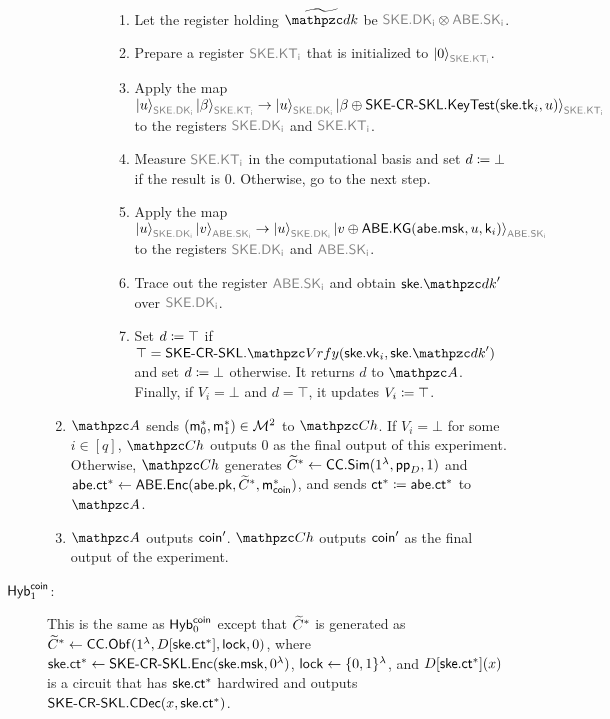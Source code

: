 \begin{description}
\begin{enumerate}
\begin{description}
\begin{enumerate}
    \item Let the register holding $\widetilde{\qdk}$ be $\qreg{SKE.DK_i}\tensor\qreg{ABE.SK_i}$.
    \item Prepare a register $\qreg{SKE.KT_i}$ that is initialized to $\ket{0}_{\qreg{SKE.KT_i}}$.
    \item Apply the map $\ket{u}_{\qreg{SKE.DK_i}}\ket{\beta}_{\qreg{SKE.KT_i}}\ra\ket{u}_{\qreg{SKE.DK_i}}\ket{\beta\oplus\SKECRSKL.\KeyTest(\ske.\tk_i,u)}_{\qreg{SKE.KT_i}}$ to the registers $\qreg{SKE.DK_i}$ and $\qreg{SKE.KT_i}$.
    \item Measure $\qreg{SKE.KT_i}$ in the computational basis and
        set $d\coloneqq\bot$ if the result is $0$. Otherwise, go to the next step.
    \item Apply the map
        $\ket{u}_{\qreg{SKE.DK_i}}\ket{v}_{\qreg{ABE.SK_i}}\ra\ket{u}_{\qreg{SKE.DK_i}}\ket{v\oplus\ABE.\KG(\abe.\msk,u,\key_i)}_{\qreg{ABE.SK_i}}$ to the registers $\qreg{SKE.DK_i}$ and $\qreg{ABE.SK_i}$.
    \item Trace out the register $\qreg{ABE.SK_i}$ and obtain $\ske.\qdk^\prime$ over $\qreg{SKE.DK_i}$.
    \item Set $d\coloneqq\top$ if
        $\top=\SKECRSKL.\qVrfy(\ske.\vk_i,\ske.\qdk')$ and set $d\coloneqq\bot$ otherwise.
It returns $d$ to $\qA$. Finally, if $V_i=\bot$ and $d=\top$, it updates $V_i\coloneqq \top$. 
\end{enumerate}
            \end{description}
            \item $\qA$ sends $(\mathsf{m}_0^*,\mathsf{m}_1^*)\in \mathcal{M}^2$ to
                $\qCh$. If $V_i=\bot$ for some $i\in[q]$,
                $\qCh$ outputs $0$ as the final output of this
                experiment. Otherwise, $\qCh$ generates
                $\widetilde{C}^*\leftarrow\mathsf{CC}.\mathsf{Sim}(1^\lambda, \mathsf{pp}_D, 1)$ and $\mathsf{abe}.\mathsf{ct}^*\leftarrow\mathsf{ABE}.\mathsf{Enc}(\mathsf{abe}.\mathsf{pk},\widetilde{C}^*,\mathsf{m}_{\mathsf{coin}}^*)$, and sends $\mathsf{ct}^*\coloneqq\mathsf{abe}.\mathsf{ct}^*$ to $\qA$.
            \item $\qA$ outputs $\mathsf{coin}^\prime$. $\qCh$ outputs $\mathsf{coin}'$ as the final output of the experiment.
        \end{enumerate}
        
\item[$\mathsf{Hyb}_{1}^{\mathsf{coin}}$:]This is the same as $\mathsf{Hyb}_{0}^{\mathsf{coin}}$ except
that $\widetilde{C}^*$ is generated as
$\widetilde{C}^*\leftarrow\mathsf{CC}.\mathsf{Obf}(1^\lambda,D[\mathsf{ske}.\mathsf{ct}^*], \mathsf{lock}, 0)$, where
$\mathsf{ske}.\mathsf{ct}^*\leftarrow\mathsf{SKE}\textrm{-}\mathsf{CR}\textrm{-}\mathsf{SKL}.\mathsf{Enc}(\mathsf{ske}.\mathsf{msk},0^\lambda)$,
$\mathsf{lock}\leftarrow\{0,1\}^\lambda$, and $D[\mathsf{ske}.\mathsf{ct}^*](x)$ is a circuit that has
$\mathsf{ske}.\mathsf{ct}^*$ hardwired and outputs $\mathsf{SKE}\textrm{-}\mathsf{CR}\textrm{-}\mathsf{SKL}.\mathsf{CDec}(x,\mathsf{ske}.\mathsf{ct}^*)$.

\end{description}

